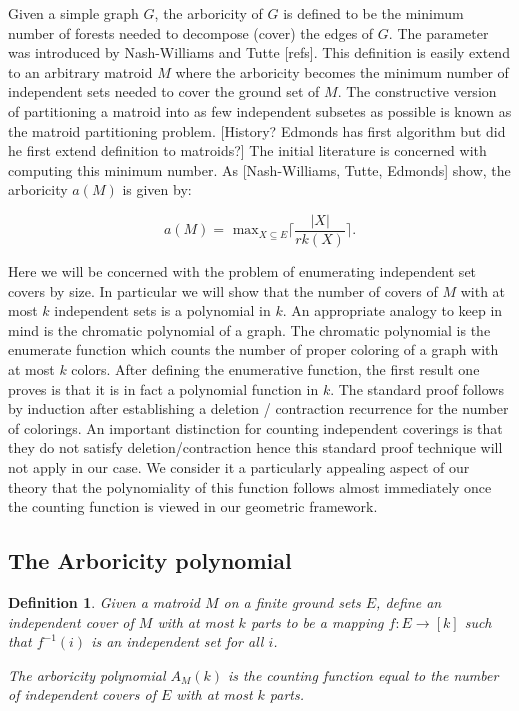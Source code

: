 \documentclass[12pt,reqno]{amsart}
\newtheorem{definition}{Definition}
\numberwithin{definition}{section}
\begin{document}
Given a simple graph $G$, the arboricity of $G$ is defined to be the
minimum number of forests needed to decompose (cover) the edges of
$G$.  The parameter was introduced by Nash-Williams and Tutte [refs].
This definition is easily extend to an arbitrary matroid $M$ where the
arboricity becomes the minimum number of independent sets needed to
cover the ground set of $M$.  The constructive version of partitioning
a matroid into as few independent subsetes as possible is known as the
matroid partitioning problem. [History?  Edmonds has first algorithm
  but did he first extend definition to matroids?]  The initial
literature is concerned with computing this minimum number.  As
[Nash-Williams, Tutte, Edmonds] show, the arboricity $a(M)$ is given
by:

$$ a(M) = \textrm{ max}_{X\subseteq E} \lceil { \frac{|X|}{rk(X)}} \rceil . $$

Here we will be concerned with the problem of enumerating independent
set covers by size.  In particular we will show that the number of
covers of $M$ with at most $k$ independent sets is a polynomial in
$k$.  An appropriate analogy to keep in mind is the chromatic
polynomial of a graph.  The chromatic polynomial is the enumerate
function which counts the number of proper coloring of a graph with at
most $k$ colors.  After defining the enumerative function, the first
result one proves is that it is in fact a polynomial function in $k$.
The standard proof follows by induction after establishing a deletion
/ contraction recurrence for the number of colorings.  An important
distinction for counting independent coverings is that they do not
satisfy deletion/contraction hence this standard proof technique will
not apply in our case.  We consider it a particularly appealing aspect
of our theory that the polynomiality of this function follows almost
immediately once the counting function is viewed in our geometric
framework.

\subsection{The Arboricity polynomial}

\begin{definition} Given a matroid $M$ on a finite ground sets $E$, define an independent cover of $M$ with at most $k$ parts to be a mapping $f : E \rightarrow [k]$ such that $f^{-1}(i)$ is an independent set for all $i$.  

  The arboricity polynomial $A_M(k)$ is the counting function equal to the number of independent covers of $E$ with at most $k$ parts.
\end{definition}
\end{document}
